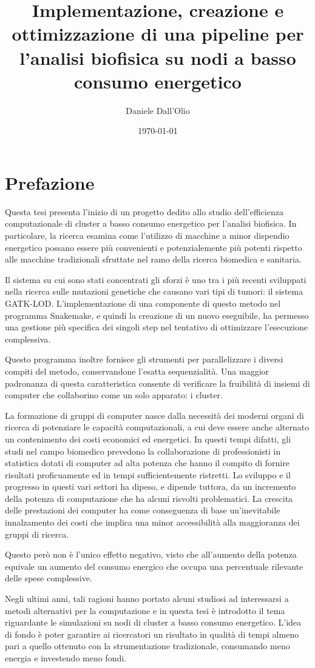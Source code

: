 \documentclass[12pt, a4paper]{report}
\title{Implementazione, creazione e ottimizzazione di una pipeline per l'analisi biofisica su nodi a basso consumo energetico}
\author{Daniele Dall'Olio}
\date{\today}
\begin{document}
\section*{Prefazione}
Questa tesi presenta l'inizio di un progetto dedito allo studio dell'efficienza computazionale di cluster a basso consumo energetico per l'analisi biofisica.
In particolare, la ricerca esamina come l'utilizzo di macchine a minor dispendio energetico possano essere più convenienti e potenzialemente più potenti rispetto alle macchine tradizionali sfruttate nel ramo della ricerca biomedica e sanitaria.


Il sistema su cui sono stati concentrati gli sforzi è uno tra i più recenti sviluppati nella ricerca sulle mutazioni genetiche che causano vari tipi di tumori: il sistema GATK-LOD.
L'implementazione di una componente di questo metodo nel programma Snakemake, e quindi la creazione di un nuovo eseguibile, ha permesso una gestione più specifica dei singoli step nel tentativo di ottimizzare l'esecuzione complessiva. 

Questo programma inoltre fornisce gli strumenti per parallelizzare i diversi compiti del metodo, conservandone l'esatta sequenzialità.
Una maggior padronanza di questa caratteristica consente di verificare la fruibilità di insiemi di computer che collaborino come un solo apparato: i cluster.

La formazione di gruppi di computer nasce dalla necessità dei moderni organi di ricerca di potenziare le capacità computazionali, a cui deve essere anche alternato un contenimento dei costi economici ed energetici.
In questi tempi difatti, gli studi nel campo biomedico prevedono la collaborazione di professionisti in statistica dotati di computer ad alta potenza che hanno il compito di fornire risultati proficuamente ed in tempi sufficientemente ristretti.
Lo sviluppo e il progresso in questi vari settori ha dipeso, e dipende tuttora, da un incremento della potenza di computazione che ha alcuni risvolti problematici.
La crescita delle prestazioni dei computer ha come conseguenza di base un'inevitabile innalzamento dei costi che implica una minor accessibilità alla maggioranza dei gruppi di ricerca.

Questo però non è l'unico effetto negativo, visto che all'aumento della potenza equivale un aumento del consumo energico che occupa una percentuale rilevante delle spese complessive.

Negli ultimi anni, tali ragioni hanno portato alcuni studiosi ad interessarsi a metodi alternativi per la computazione e in questa tesi è introdotto il tema riguardante le simulazioni su nodi di cluster a basso consumo energetico.
L'idea di fondo è poter garantire ai ricercatori un risultato in qualità di tempi almeno pari a quello ottenuto con la strumentazione tradizionale, consumando meno energia e investendo meno fondi.
\end{document}
